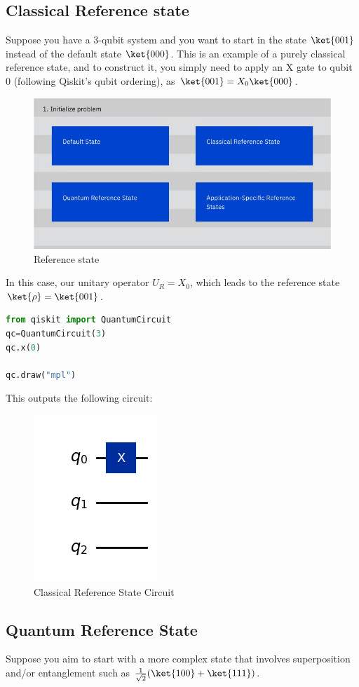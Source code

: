 \documentclass[12pt, oneside]{book}
\theoremstyle{definition}
\theoremstyle{definition}
\theoremstyle{remark}
\begin{document}
\subsection{Classical Reference state}
Suppose you have a 3-qubit system and you want to start in the state $\ket{001}$ instead of the default state $\ket{000}$. This is an example of a purely classical reference state, and to construct it, you simply need to apply an X gate to qubit 0 (following Qiskit's qubit ordering), as $\ket{001}=X_0\ket{000}$.
\begin{figure}[H]
    \centering
    \includegraphics[width=0.25\linewidth]{../images/ref_state.png}
    \caption{Reference state}
    \label{fig:ref_state}
\end{figure}
In this case, our unitary operator $U_R=X_0$, which leads to the reference state $\ket{\rho}=\ket{001}$.
\begin{lstlisting}[language=Python]
from qiskit import QuantumCircuit
qc=QuantumCircuit(3)
qc.x(0)

qc.draw("mpl")
\end{lstlisting}
This outputs the following circuit:
\begin{figure}[H]
    \centering
    \includegraphics[width=0.5\linewidth]{../images/ref_state_dia.png}
    \caption{Classical Reference State Circuit}
    \label{fig:ref_state_classical}
\end{figure}
\subsection{Quantum Reference State}
Suppose you aim to start with a more complex state that involves superposition and/or entanglement such as $\frac{1}{\sqrt{2}}(\ket{100}+\ket{111})$.
\end{document}
